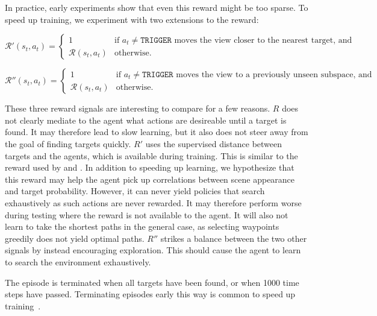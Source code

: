 In practice, early experiments show that even this reward might be too sparse.
To speed up training, we experiment with two extensions to the reward:

\[
    \mathcal{R}'(s_t, a_t) =
    \begin{cases}
        1 & \text{if \(a_t \neq \mathtt{TRIGGER}\) moves the view closer to the nearest target, and} \\
        \mathcal{R}(s_t, a_t) & \text{otherwise}.
    \end{cases}
\]

\[
    \mathcal{R}''(s_t, a_t) =
    \begin{cases}
        1 & \text{if \(a_t \neq \mathtt{TRIGGER}\) moves the view to a previously unseen subspace, and} \\
        \mathcal{R}(s_t, a_t) & \text{otherwise}.
    \end{cases}
\]

These three reward signals are interesting to compare for a few reasons.
\(R\) does not clearly mediate to the agent what actions are desireable until a target is found.
It may therefore lead to slow learning, but it also does not steer away from the goal of finding targets quickly.
\(R'\) uses the supervised distance between targets and the agents, which is available during training.
This is similar to the reward used by \cite{caicedo_active_2015} and \cite{ghesu_multi_scale_2019}.
In addition to speeding up learning, we hypothesize that this reward may help the agent pick up correlations between scene appearance and target probability.
However, it can never yield policies that search exhaustively as such actions are never rewarded.
It may therefore perform worse during testing where the reward is not available to the agent.
It will also not learn to take the shortest paths in the general case, as selecting waypoints greedily does not yield optimal paths.
\(R''\) strikes a balance between the two other signals by instead encouraging exploration.
This should cause the agent to learn to search the environment exhaustively.

The episode is terminated when all targets have been found, or when 1000 time steps have passed.
Terminating episodes early this way is common to speed up training~\cite{pardo_timelimits_2022}.



